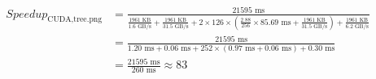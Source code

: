 \documentclass{standalone}
\begin{document}

\begin{equation*}
\begin{aligned}
Speedup_{\text{CUDA,tree.png}}&= \frac
	{ 21595 \text{ ms} }
	{ 
		\frac{1961 \text { KB}}{1.6 \text{ GB/s}} + 
		\frac{1961 \text { KB}}{31.5 \text{ GB/s}} +
		2 \times 126 \times \left(
			\frac{2.88}{256} \times 85.69 \text{ ms}+
			\frac{1961 \text { KB}}{31.5 \text{ GB/s}} 
		\right) + 
		\frac{1961 \text { KB}}{ \text{6.2 GB/s}}
	} \\
&= \frac
	{ 21595 \text{ ms} }
	{
		1.20 \text{ ms} +
		0.06 \text{ ms} +
	 	252 \times \left(
			0.97 \text{ ms} +
			0.06 \text{ ms}
		\right) +
		0.30 \text{ ms}
	} \\
&= \frac
	{ 21595 \text{ ms} }
	{ 260 \text{ ms} }
	\approx 83
\end{aligned}
\end{equation*}
\end{document}
